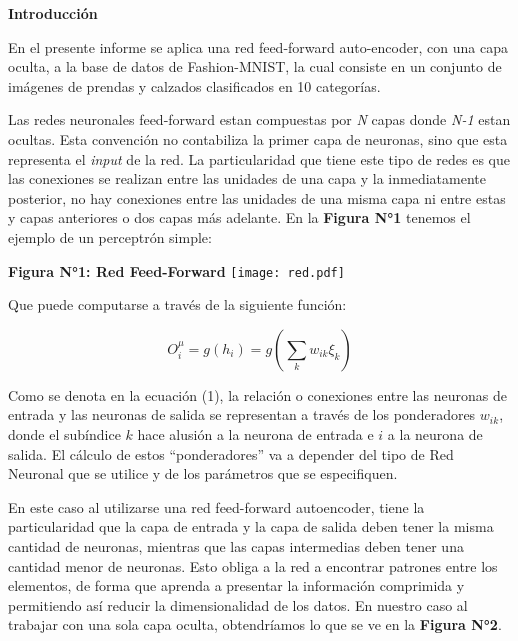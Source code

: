 \documentclass[12pt,a4paper]{article}
\begin{document}
\begin{multicols}{2}
\begin{center}
\begin{large}
\textbf{Introducción}
\end{large}
\end{center}
\bigskip

En el presente informe se aplica una red feed-forward auto-encoder, con una capa oculta, a la base de datos de Fashion-MNIST, la cual consiste en un conjunto de imágenes de prendas y calzados clasificados en 10 categorías. 

Las redes neuronales feed-forward estan compuestas por \textit{N} capas donde \textit{N-1} estan ocultas. Esta convención no contabiliza la primer capa de neuronas, sino que esta representa el \textit{input} de  la red. La particularidad que tiene este tipo de redes es que las conexiones se realizan entre las unidades de una capa y la inmediatamente posterior, no hay conexiones entre las unidades de una misma capa ni entre estas y capas anteriores o dos capas más adelante. En la \textbf{Figura N°1} tenemos el ejemplo de un perceptrón simple:

\begin{center}
\textbf{Figura N°1: Red Feed-Forward}
\texttt{[image: red.pdf]}
\end{center}


Que puede computarse a través de la siguiente función:

\begin{equation}
O^{\mu}_i = g(h_i) = g(\sum_k w_{ik} \xi_k)
\end{equation}

Como se denota en la ecuación (1), la relación o conexiones entre las neuronas de entrada y las neuronas de salida se representan a través de los ponderadores $w_{ik}$, donde el subíndice $k$ hace alusión a la neurona de entrada e $i$ a la neurona de salida. El cálculo de estos ``ponderadores'' va a depender del tipo de Red Neuronal que se utilice y de los parámetros que se especifiquen. 

En este caso al utilizarse una red feed-forward autoencoder, tiene la particularidad que la capa de entrada y la capa de salida deben tener la misma cantidad de neuronas, mientras que las capas intermedias deben tener una cantidad menor de neuronas. Esto obliga a la red a encontrar patrones entre los elementos, de forma que aprenda a presentar la información comprimida y permitiendo así reducir la dimensionalidad de los datos. En nuestro caso al trabajar con una sola capa oculta, obtendríamos lo que se ve en la \textbf{Figura N°2}.


\end{multicols}
\end{document}
